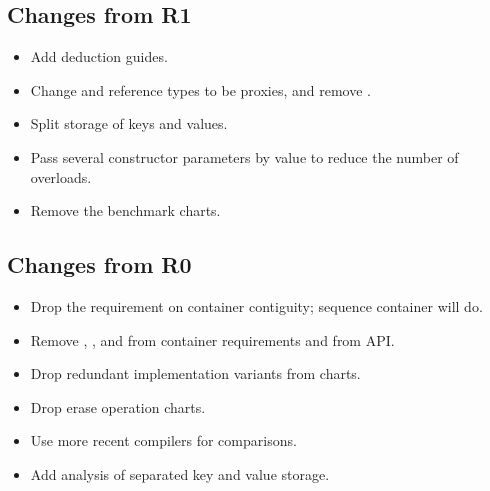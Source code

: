 \subsection{Changes from R1}

\begin{itemize}
  \item Add deduction guides.
  \item Change  and reference types to be proxies, and remove
    .
  \item Split storage of keys and values.
  \item Pass several constructor parameters by value to reduce the number of overloads.
  \item Remove the benchmark charts.
\end{itemize}

\subsection{Changes from R0}

\begin{itemize}
  \item Drop the requirement on container contiguity; sequence container will
    do.
  \item Remove , , and 
    from container requirements and from  API.
  \item Drop redundant implementation variants from charts.
  \item Drop erase operation charts.
  \item Use more recent compilers for comparisons.
  \item Add analysis of separated key and value storage.
\end{itemize}

